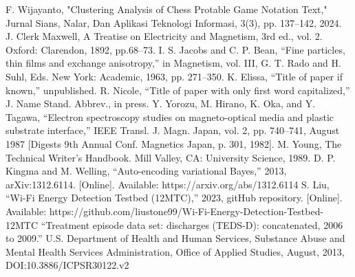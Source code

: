 \documentclass[conference]{IEEEtran}
\begin{document}
\begin{thebibliography}{00}
 F. Wijayanto, "Clustering Analysis of Chess Protable Game Notation Text," Jurnal Sians, Nalar, Dan Aplikasi Teknologi Informasi, 3(3), pp. 137--142, 2024.
 J. Clerk Maxwell, A Treatise on Electricity and Magnetism, 3rd ed., vol. 2. Oxford: Clarendon, 1892, pp.68--73.
 I. S. Jacobs and C. P. Bean, ``Fine particles, thin films and exchange anisotropy,'' in Magnetism, vol. III, G. T. Rado and H. Suhl, Eds. New York: Academic, 1963, pp. 271--350.
 K. Elissa, ``Title of paper if known,'' unpublished.
 R. Nicole, ``Title of paper with only first word capitalized,'' J. Name Stand. Abbrev., in press.
 Y. Yorozu, M. Hirano, K. Oka, and Y. Tagawa, ``Electron spectroscopy studies on magneto-optical media and plastic substrate interface,'' IEEE Transl. J. Magn. Japan, vol. 2, pp. 740--741, August 1987 [Digests 9th Annual Conf. Magnetics Japan, p. 301, 1982].
 M. Young, The Technical Writer's Handbook. Mill Valley, CA: University Science, 1989.
 D. P. Kingma and M. Welling, ``Auto-encoding variational Bayes,'' 2013, arXiv:1312.6114. [Online]. Available: https://arxiv.org/abs/1312.6114
 S. Liu, ``Wi-Fi Energy Detection Testbed (12MTC),'' 2023, gitHub repository. [Online]. Available: https://github.com/liustone99/Wi-Fi-Energy-Detection-Testbed-12MTC
 ``Treatment episode data set: discharges (TEDS-D): concatenated, 2006 to 2009.'' U.S. Department of Health and Human Services, Substance Abuse and Mental Health Services Administration, Office of Applied Studies, August, 2013, DOI:10.3886/ICPSR30122.v2
\end{thebibliography}
\end{document}

